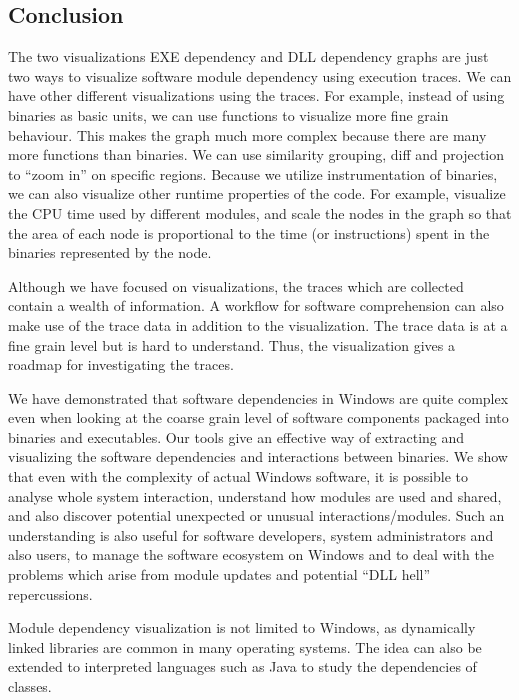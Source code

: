 \subsection{Conclusion}


The two visualizations EXE dependency and DLL dependency graphs are just two
ways to visualize software module dependency using execution traces.
We can have other different visualizations using the traces.
For example, instead of using binaries as basic units, we can use functions
to visualize more fine grain behaviour.
This makes the graph much more complex because there are many more functions
than binaries.
We can use similarity grouping, diff and projection to ``zoom in''
on specific regions.
Because we utilize instrumentation of binaries, we can also visualize other runtime
properties of the code.
For example, visualize the CPU time used by different modules,
and scale the nodes in the graph so that the area of each node is proportional to the time
(or instructions) spent in the binaries represented by the node.

Although we have focused on visualizations, the traces which are collected
contain a wealth of information. A workflow for software comprehension can also make use
of the trace data in addition to the visualization.
The trace data is at a fine grain level but is hard to understand.
Thus, the visualization gives a roadmap for investigating the traces.

We have demonstrated that software dependencies in Windows are quite
complex even when looking at the coarse grain level of software components
packaged into binaries and executables.
Our tools give an effective way of extracting and
visualizing the software dependencies and interactions between binaries.
We show that even with the complexity of actual Windows software,
it is possible to analyse whole system interaction,
understand how modules are used and shared,
and also discover potential unexpected or unusual interactions/modules.
Such an understanding is also useful for software developers,
system administrators and also users, to manage the
software ecosystem on Windows and to deal with the problems which arise
from module updates and potential ``DLL hell'' repercussions.

Module dependency visualization is not limited to Windows, as
dynamically linked libraries are common in many operating systems.
The idea can also be extended to interpreted languages such as Java
to study the dependencies of classes.

